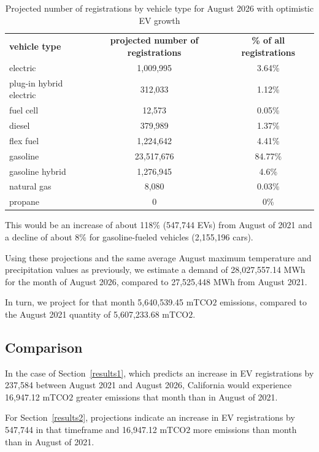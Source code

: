 \documentclass{article}
\begin{document}
\begin{table}[H]
    \centering
    \begin{tabular}{lcc}
        \textbf{vehicle type} & \textbf{projected number of registrations} & \textbf{\% of all registrations}\\
         electric & 1,009,995 & 3.64\%\\
         plug-in hybrid electric & 312,033 & 1.12\%\\
         fuel cell & 12,573 & 0.05\%\\
         diesel & 379,989 & 1.37\%\\
         flex fuel & 1,224,642 &  4.41\%\\
         gasoline & 23,517,676 & 84.77\%\\
         gasoline hybrid & 1,276,945 & 4.6\%\\
         natural gas & 8,080 & 0.03\%\\
         propane & 0 & 0\%
    \end{tabular}
    \caption{Projected number of registrations by vehicle type for August 2026 with optimistic EV growth}
    \label{table:projection}
\end{table}

This would be an increase of about 118\% (547,744 EVs) from August of 2021 and a decline of about 8\% for gasoline-fueled vehicles (2,155,196 cars).

Using these projections and the same average August maximum temperature and precipitation values as previously, we estimate a demand of 28,027,557.14 MWh  for the month of August 2026, compared to 27,525,448 MWh from August 2021.

In turn, we project for that month 5,640,539.45 mTCO\(2\) emissions, compared to the August 2021 quantity of 5,607,233.68 mTCO\(2\).


\subsection{\label{comparison}Comparison}

In the case of Section~\ref{results1}, which predicts an increase in EV registrations by 237,584 between August 2021 and August 2026, California would experience 16,947.12 mTCO\(2\) greater emissions that month than in August of 2021.

For Section~\ref{results2}, projections indicate an increase in EV registrations by 547,744 in that timeframe and 16,947.12 mTCO\(2\) more emissions than month than in August of 2021.
\end{document}
